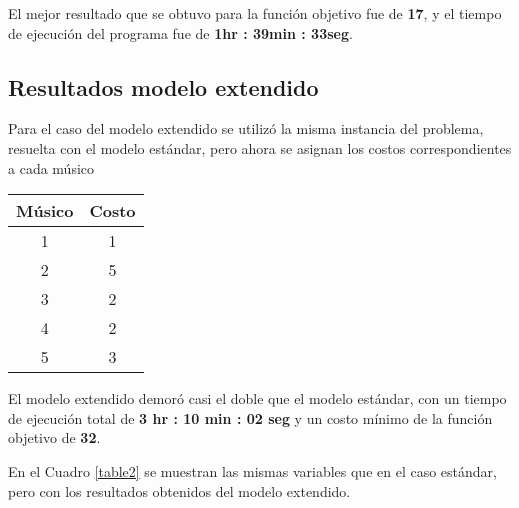 \documentclass[journal, 10pt]{IEEEtran}
\begin{document}
El mejor resultado que se obtuvo para la función objetivo fue de \textbf{17}, y el tiempo de ejecución del programa fue de \textbf{1hr : 39min : 33seg}.

\newpage
\subsection{Resultados modelo extendido}
Para el caso del modelo extendido se utilizó la misma instancia del problema, resuelta con el modelo estándar, pero ahora se asignan los costos correspondientes a cada músico

\begin{center}
	\begin{tabular}{cc}
	Músico & Costo \\ \hline
	1 & 1\\
	2 & 5\\
	3 & 2\\
	4 & 2\\
	5 & 3
\end{tabular}
\end{center}


El modelo extendido demoró casi el doble que el modelo estándar, con un tiempo de ejecución total de \textbf{3 hr : 10 min : 02 seg} y un costo mínimo de la función objetivo de \textbf{32}. 

En el Cuadro \ref{table2} se muestran las mismas variables que en el caso estándar, pero con los resultados obtenidos del modelo extendido.
\end{document}
